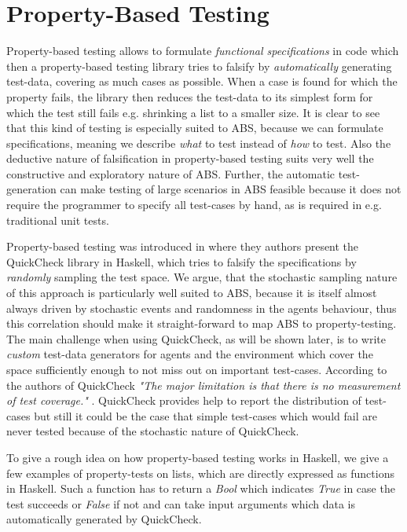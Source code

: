 \section*{Property-Based Testing}
\label{sec:proptesting}

Property-based testing allows to formulate \textit{functional specifications} in code which then a property-based testing library tries to falsify by \textit{automatically} generating test-data, covering as much cases as possible. When a case is found for which the property fails, the library then reduces the test-data to its simplest form for which the test still fails e.g. shrinking a list to a smaller size. It is clear to see that this kind of testing is especially suited to ABS, because we can formulate specifications, meaning we describe \textit{what} to test instead of \textit{how} to test. Also the deductive nature of falsification in property-based testing suits very well the constructive and exploratory nature of ABS. Further, the automatic test-generation can make testing of large scenarios in ABS feasible because it does not require the programmer to specify all test-cases by hand, as is required in e.g. traditional unit tests.

Property-based testing was introduced in \cite{claessen_quickcheck_2000,claessen_testing_2002} where they authors present the QuickCheck library in Haskell, which tries to falsify the specifications by \textit{randomly} sampling the test space. We argue, that the stochastic sampling nature of this approach is particularly well suited to ABS, because it is itself almost always driven by stochastic events and randomness in the agents behaviour, thus this correlation should make it straight-forward to map ABS to property-testing. The main challenge when using QuickCheck, as will be shown later, is to write \textit{custom} test-data generators for agents and the environment which cover the space sufficiently enough to not miss out on important test-cases. According to the authors of QuickCheck \textit{"The major limitation is that there is no measurement of test coverage."} \cite{claessen_quickcheck_2000}. QuickCheck provides help to report the distribution of test-cases but still it could be the case that simple test-cases which would fail are never tested because of the stochastic nature of QuickCheck.

To give a rough idea on how property-based testing works in Haskell, we give a few examples of property-tests on lists, which are directly expressed as functions in Haskell. Such a function has to return a \textit{Bool} which indicates \textit{True} in case the test succeeds or \textit{False} if not and can take input arguments which data is automatically generated by QuickCheck. %

